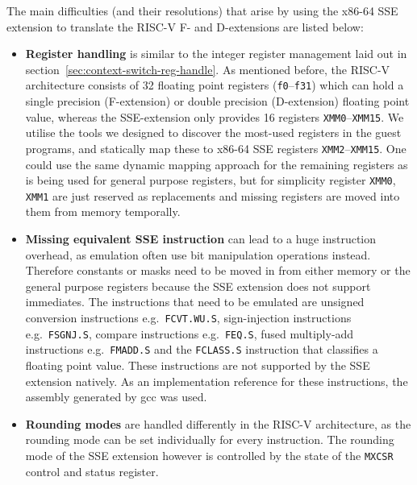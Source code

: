 The main difficulties (and their resolutions) that arise by using the x86-64 SSE extension to translate the RISC-V F- and D-extensions are listed below:
\begin{itemize}
    \item \textbf{Register handling} is similar to the integer register management laid out in section~\ref{sec:context-switch-reg-handle}.
            As mentioned before, the RISC-V architecture consists of 32 floating point registers (\texttt{f0}--\texttt{f31}) which can hold a single precision (F-extension) or double precision (D-extension) floating point value, whereas the SSE-extension only provides 16 registers \texttt{XMM0}--\texttt{XMM15}.
            We utilise the tools we designed to discover the most-used registers in the guest programs, and statically map these to x86-64 SSE registers \texttt{XMM2}--\texttt{XMM15}.
            One could use the same dynamic mapping approach for the remaining registers as is being used for general purpose registers, but for simplicity register \texttt{XMM0}, \texttt{XMM1} are just reserved as replacements and missing registers are moved into them from memory temporally.
    \item \textbf{Missing equivalent SSE instruction} can lead to a huge instruction overhead, as emulation often use bit manipulation operations instead.
            Therefore constants or masks need to be moved in from either memory or the general purpose registers because the SSE extension does not support immediates.
            The instructions that need to be emulated are unsigned conversion instructions e.g.~\texttt{FCVT.WU.S}, sign-injection instructions e.g.~\texttt{FSGNJ.S}, compare instructions e.g.~\texttt{FEQ.S}, fused multiply-add instructions e.g.~\texttt{FMADD.S} and the \texttt{FCLASS.S} instruction that classifies a floating point value.
            These instructions are not supported by the SSE extension natively.
            As an implementation reference for these instructions, the assembly generated by gcc was used.
    \item \textbf{Rounding modes} are handled differently in the RISC-V architecture, as the rounding mode can be set individually for every instruction.
            The rounding mode of the SSE extension however is controlled by the state of the \texttt{MXCSR} control and status register.

\end{itemize}
